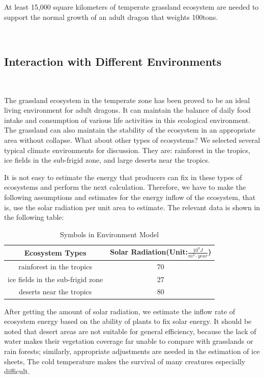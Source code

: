 \documentclass{mcmthesis}
\begin{document}
At least 15,000 square kilometers of temperate grassland ecosystem are needed to support the normal growth of an adult dragon that weights 100tons.


~\ \
\subsection{Interaction with Different Environments}
~\ \

The grassland ecosystem in the temperate zone has been proved to be an ideal living environment for adult dragons. It can maintain the balance of daily food intake and consumption of various life activities in this ecological environment. The grassland can also maintain the stability of the ecosystem in an appropriate area without collapse. What about other types of ecosystems? We selected several typical climate environments for discussion. They are: rainforest in the tropics, ice fields in the sub-frigid zone, and large deserts near the tropics.

It is not easy to estimate the energy that producers can fix in these types of ecosystems and perform the next calculation. Therefore, we have to make the following assumptions and estimates for the energy inflow of the ecosystem, that is, use the solar radiation per unit area to estimate. The relevant data is shown in the following table:
\begin{table}[h]
\centering
\caption{Symbols in Environment Model}
\begin{tabular}{cc}
\toprule
\textbf{Ecosystem Types}          & \textbf{Solar Radiation(Unit:$\frac{10^{8}J}{m^{2}\cdot year}$)}    \\
\midrule
rainforest in the tropics         &  70            \\
ice fields in the sub-frigid zone &  27            \\
deserts near the tropics          &  80            \\

\bottomrule
\end{tabular}\label{tb:Variables6}
\end{table}


After getting the amount of solar radiation, we estimate the inflow rate of ecosystem energy based on the ability of plants to fix solar energy. It should be noted that desert areas are not suitable for general efficiency, because the lack of water makes their vegetation coverage far unable to compare with grasslands or rain forests; similarly, appropriate adjustments are needed in the estimation of ice sheets, The cold temperature makes the survival of many creatures especially difficult.
\end{document}
